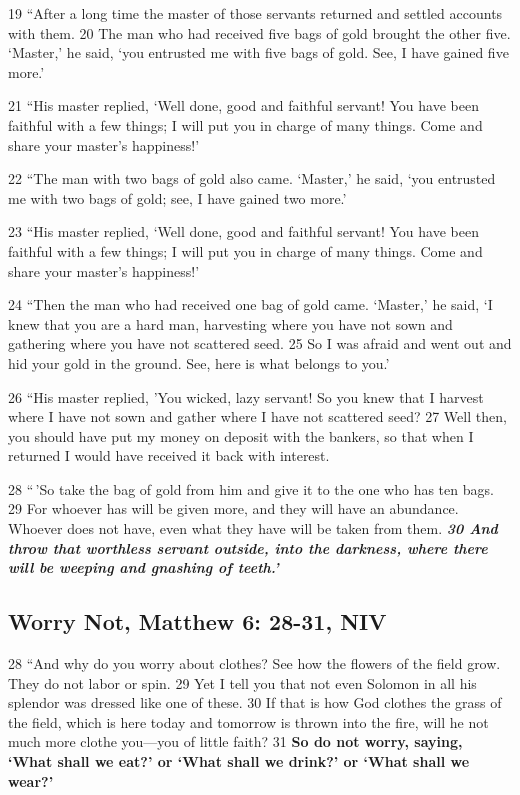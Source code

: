 \documentclass[
]{book}
\begin{document}
19 ``After a long time the master of those servants returned and settled accounts with them. 20 The man who had received five bags of gold brought the other five. `Master,' he said, `you entrusted me with five bags of gold. See, I have gained five more.'

21 ``His master replied, `Well done, good and faithful servant! You have been faithful with a few things; I will put you in charge of many things. Come and share your master's happiness!'

22 ``The man with two bags of gold also came. `Master,' he said, `you entrusted me with two bags of gold; see, I have gained two more.'

23 ``His master replied, `Well done, good and faithful servant! You have been faithful with a few things; I will put you in charge of many things. Come and share your master's happiness!'

24 ``Then the man who had received one bag of gold came. `Master,' he said, `I knew that you are a hard man, harvesting where you have not sown and gathering where you have not scattered seed. 25 So I was afraid and went out and hid your gold in the ground. See, here is what belongs to you.'

26 ``His master replied, 'You wicked, lazy servant! So you knew that I harvest where I have not sown and gather where I have not scattered seed? 27 Well then, you should have put my money on deposit with the bankers, so that when I returned I would have received it back with interest.

28 ``\,'So take the bag of gold from him and give it to the one who has ten bags. 29 For whoever has will be given more, and they will have an abundance. Whoever does not have, even what they have will be taken from them. \textbf{\emph{30 And throw that worthless servant outside, into the darkness, where there will be weeping and gnashing of teeth.'}}

\hypertarget{worry-not-matthew-6-28-31-niv}{%
\subsection{Worry Not, Matthew 6: 28-31, NIV}\label{worry-not-matthew-6-28-31-niv}}

28 ``And why do you worry about clothes? See how the flowers of the field grow. They do not labor or spin. 29 Yet I tell you that not even Solomon in all his splendor was dressed like one of these. 30 If that is how God clothes the grass of the field, which is here today and tomorrow is thrown into the fire, will he not much more clothe you---you of little faith? 31 \textbf{So do not worry, saying, `What shall we eat?' or `What shall we drink?' or `What shall we wear?'}
\end{document}
